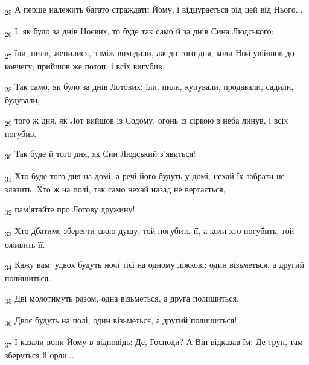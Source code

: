 \begin{tcolorbox}
\textsubscript{25} А перше належить багато страждати Йому, і відцурається рід цей від Нього...
\end{tcolorbox}
\begin{tcolorbox}
\textsubscript{26} І, як було за днів Ноєвих, то буде так само й за днів Сина Людського:
\end{tcolorbox}
\begin{tcolorbox}
\textsubscript{27} їли, пили, женилися, заміж виходили, аж до того дня, коли Ной увійшов до ковчегу; прийшов же потоп, і всіх вигубив.
\end{tcolorbox}
\begin{tcolorbox}
\textsubscript{28} Так само, як було за днів Лотових: їли, пили, купували, продавали, садили, будували;
\end{tcolorbox}
\begin{tcolorbox}
\textsubscript{29} того ж дня, як Лот вийшов із Содому, огонь із сіркою з неба линув, і всіх погубив.
\end{tcolorbox}
\begin{tcolorbox}
\textsubscript{30} Так буде й того дня, як Син Людський з'явиться!
\end{tcolorbox}
\begin{tcolorbox}
\textsubscript{31} Хто буде того дня на домі, а речі його будуть у домі, нехай їх забрати не злазить. Хто ж на полі, так само нехай назад не вертається,
\end{tcolorbox}
\begin{tcolorbox}
\textsubscript{32} пам'ятайте про Лотову дружину!
\end{tcolorbox}
\begin{tcolorbox}
\textsubscript{33} Хто дбатиме зберегти свою душу, той погубить її, а коли хто погубить, той оживить її.
\end{tcolorbox}
\begin{tcolorbox}
\textsubscript{34} Кажу вам: удвох будуть ночі тієї на одному ліжкові: один візьметься, а другий полишиться.
\end{tcolorbox}
\begin{tcolorbox}
\textsubscript{35} Дві молотимуть разом, одна візьметься, а друга полишиться.
\end{tcolorbox}
\begin{tcolorbox}
\textsubscript{36} Двоє будуть на полі, один візьметься, а другий полишиться!
\end{tcolorbox}
\begin{tcolorbox}
\textsubscript{37} І казали вони Йому в відповідь: Де, Господи? А Він відказав їм: Де труп, там зберуться й орли...
\end{tcolorbox}
